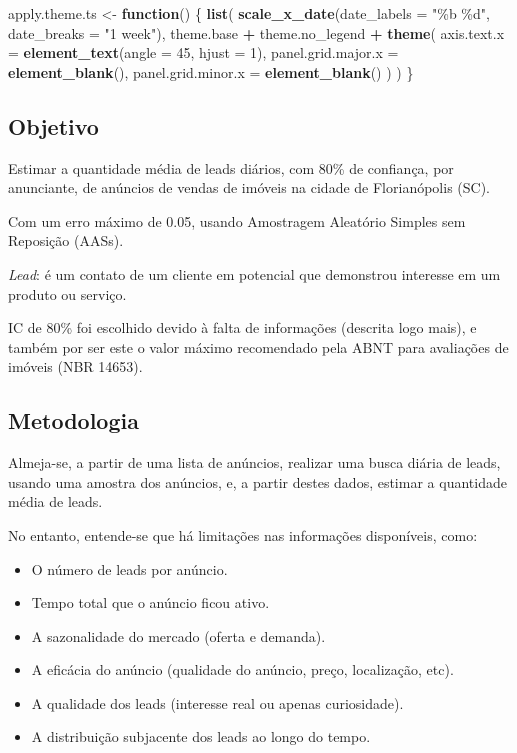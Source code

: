 \documentclass[
]{article}
\newenvironment{Shaded}{\begin{snugshade}}{\end{snugshade}}
\newcommand{\AttributeTok}[1]{\textcolor[rgb]{0.13,0.29,0.53}{#1}}
\newcommand{\ControlFlowTok}[1]{\textcolor[rgb]{0.13,0.29,0.53}{\textbf{#1}}}
\newcommand{\DecValTok}[1]{\textcolor[rgb]{0.00,0.00,0.81}{#1}}
\newcommand{\FunctionTok}[1]{\textcolor[rgb]{0.13,0.29,0.53}{\textbf{#1}}}
\newcommand{\NormalTok}[1]{#1}
\newcommand{\OtherTok}[1]{\textcolor[rgb]{0.56,0.35,0.01}{#1}}
\newcommand{\SpecialCharTok}[1]{\textcolor[rgb]{0.81,0.36,0.00}{\textbf{#1}}}
\newcommand{\StringTok}[1]{\textcolor[rgb]{0.31,0.60,0.02}{#1}}
\providecommand{\tightlist}{%
  \setlength{\itemsep}{0pt}\setlength{\parskip}{0pt}}
\begin{document}
\begin{Shaded}
\begin{Highlighting}[]
\NormalTok{apply.theme.ts }\OtherTok{\textless{}{-}} \ControlFlowTok{function}\NormalTok{() \{}
  \FunctionTok{list}\NormalTok{(}
    \FunctionTok{scale\_x\_date}\NormalTok{(}\AttributeTok{date\_labels =} \StringTok{"\%b \%d"}\NormalTok{, }\AttributeTok{date\_breaks =} \StringTok{"1 week"}\NormalTok{),}
\NormalTok{    theme.base }\SpecialCharTok{+}\NormalTok{ theme.no\_legend }\SpecialCharTok{+}
      \FunctionTok{theme}\NormalTok{(}
        \AttributeTok{axis.text.x =} \FunctionTok{element\_text}\NormalTok{(}\AttributeTok{angle =} \DecValTok{45}\NormalTok{, }\AttributeTok{hjust =} \DecValTok{1}\NormalTok{),}
        \AttributeTok{panel.grid.major.x =} \FunctionTok{element\_blank}\NormalTok{(),}
        \AttributeTok{panel.grid.minor.x =} \FunctionTok{element\_blank}\NormalTok{()}
\NormalTok{      )}
\NormalTok{  )}
\NormalTok{\}}
\end{Highlighting}
\end{Shaded}

\subsection{Objetivo}\label{objetivo}

Estimar a quantidade média de leads diários, com 80\% de confiança, por
anunciante, de anúncios de vendas de imóveis na cidade de Florianópolis
(SC).

Com um erro máximo de 0.05, usando Amostragem Aleatório Simples sem
Reposição (AASs).

\emph{Lead}: é um contato de um cliente em potencial que demonstrou
interesse em um produto ou serviço.

IC de 80\% foi escolhido devido à falta de informações (descrita logo
mais), e também por ser este o valor máximo recomendado pela ABNT para
avaliações de imóveis (NBR 14653).

\subsection{Metodologia}\label{metodologia}

Almeja-se, a partir de uma lista de anúncios, realizar uma busca diária
de leads, usando uma amostra dos anúncios, e, a partir destes dados,
estimar a quantidade média de leads.

No entanto, entende-se que há limitações nas informações disponíveis,
como:

\begin{itemize}
\tightlist
\item
  O número de leads por anúncio.
\item
  Tempo total que o anúncio ficou ativo.
\item
  A sazonalidade do mercado (oferta e demanda).
\item
  A eficácia do anúncio (qualidade do anúncio, preço, localização, etc).
\item
  A qualidade dos leads (interesse real ou apenas curiosidade).
\item
  A distribuição subjacente dos leads ao longo do tempo.
\end{itemize}
\end{document}
